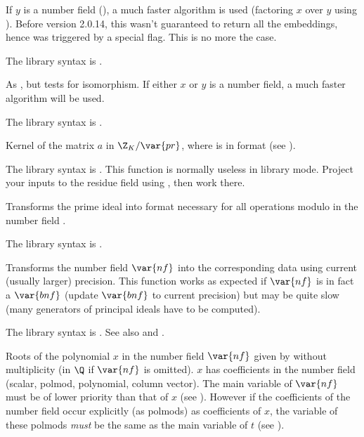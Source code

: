If $y$ is a number field (), a much faster algorithm is used
(factoring $x$ over $y$ using ). Before version 2.0.14, this
wasn't guaranteed to return all the embeddings, hence was triggered by a
special flag. This is no more the case.

The library syntax is .

\label{se:nfisisom}
As , but tests for isomorphism. If either $x$ or $y$ is a
number field, a much faster algorithm will be used.

The library syntax is .

\label{se:nfkermodpr}
Kernel of the matrix $a$ in $\Z_K/\var{pr}$, where  is in
 format (see ).

The library syntax is .
This function is normally useless in library mode. Project your
inputs to the residue field using , then work there.

\label{se:nfmodprinit}
Transforms the prime ideal  into  format necessary
for all operations modulo  in the number field .

The library syntax is .

\label{se:nfnewprec}
Transforms the number field $\var{nf}$
into the corresponding data using current (usually larger) precision. This
function works as expected if $\var{nf}$ is in fact a $\var{bnf}$ (update
$\var{bnf}$ to current precision) but may be quite slow (many generators of
principal ideals have to be computed).

The library syntax is .
See also 
and .

\label{se:nfroots}
Roots of the polynomial $x$ in the
number field $\var{nf}$ given by  without multiplicity (in $\Q$
if $\var{nf}$ is omitted). $x$ has coefficients in the number field (scalar,
polmod, polynomial, column vector). The main variable of $\var{nf}$ must be
of lower priority than that of $x$ (see ). However if the
coefficients of the number field occur explicitly (as polmods) as
coefficients of $x$, the variable of these polmods \emph{must} be the same as
the main variable of $t$ (see ).

